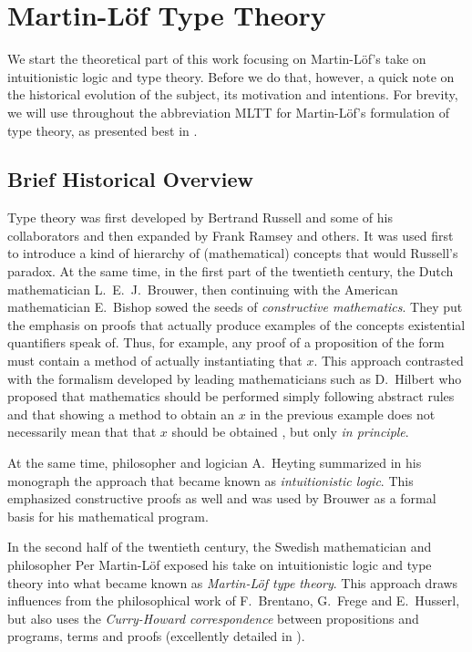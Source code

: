 
\chapter{Martin-L\"of Type Theory}
\label{ch:mltt}
\pagestyle{fancy}                           %


We start the theoretical part of this work focusing on Martin-L\"of's take
on intuitionistic logic and type theory. Before we do that, however, a quick
note on the historical evolution of the subject, its motivation and intentions.
For brevity, we will use throughout the abbreviation MLTT for Martin-L\"of's
formulation of type theory, as presented best in \cite{mltt}.

\section{Brief Historical Overview}
\indent\indent Type theory was first developed by Bertrand Russell and some of his
collaborators and then expanded by Frank Ramsey and others. It was used
first to introduce a kind of hierarchy of (mathematical) concepts
that would  Russell's paradox. At the same time, in the first
part of the twentieth century, the Dutch mathematician L.\ E.\ J.\ Brouwer,
then continuing with the American mathematician E.\ Bishop sowed the seeds
of \emph{constructive mathematics}. They put the emphasis on proofs that
actually produce examples of the concepts existential quantifiers speak of.
Thus, for example, any proof of a proposition of the form  must contain a method of actually instantiating that $ x $.
This approach contrasted with the formalism developed by leading mathematicians
such as D.\ Hilbert who proposed that mathematics should be performed
simply following abstract rules and that showing a method to obtain an $ x $
in the previous example does not necessarily mean that that $ x $ should be
obtained , but only \emph{in principle}.

At the same time, philosopher and logician A.\ Heyting summarized in his
monograph \cite{heyting} the approach that became known as
\emph{intuitionistic logic}. This emphasized constructive proofs as well
and was used by Brouwer as a formal basis for his mathematical program.

In the second half of the twentieth century, the Swedish mathematician and philosopher
Per Martin-L\"of exposed his take on intuitionistic logic and type theory
into what became known as \emph{Martin-L\"of type theory}. This approach
draws influences from the philosophical work of F.\ Brentano, G.\ Frege and
E.\ Husserl, but also uses the \emph{Curry-Howard correspondence} between
propositions and programs, terms and proofs (excellently detailed in \cite{ch}).

